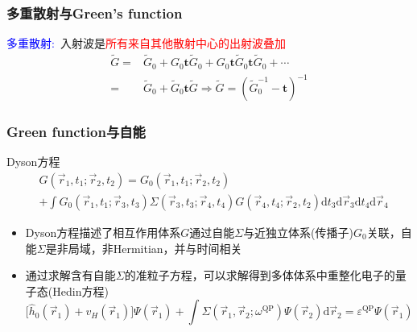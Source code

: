\documentclass[cjk,slidestop,compress,mathserif,blue]{beamer}
\begin{document}
\frame
{
	\frametitle{多重散射与\textrm{Green's function}}
\begin{figure}[h!]
	\vspace{-5pt}
\centering
{}
\label{Multiple_scattering-0-9}
\end{figure}
\textcolor{blue}{多重散射:~}入射波是\textcolor{red}{所有来自其他散射中心的出射波叠加}
			\begin{displaymath}
				\begin{aligned}
					\tilde G=&\tilde G_0+G_0\mathbf{t}\tilde G_0+G_0\mathbf{t}\tilde G_0\mathbf{t}\tilde G_0+\cdots\\
					=&\tilde G_0+\tilde G_0\mathbf{t}\tilde G \Longrightarrow \tilde G=(\tilde G_0^{-1}-\mathbf{t})^{-1}
				\end{aligned}
			\end{displaymath}
}

\frame
{
	\frametitle{\textrm{Green function}与自能}
	\textrm{Dyson}方程
	\begin{displaymath}
		\begin{aligned}
	&G(\vec r_1,t_1;\vec r_2,t_2)=G_0(\vec r_1,t_1;\vec r_2,t_2)\\
	&+\int G_0(\vec r_1,t_1;\vec r_3,t_3)\Sigma(\vec r_3,t_3;\vec r_4,t_4)G(\vec r_4,t_4;\vec r_2,t_2)\mathrm{d}t_3\mathrm{d}\vec r_3\mathrm{d}t_4\mathrm{d}\vec r_4
		\end{aligned}
	\end{displaymath}
	\begin{itemize}
		\item \textrm{Dyson}方程描述了相互作用体系$G$通过自能$\Sigma$与近独立体系(传播子)$G_0$关联，自能$\Sigma$是非局域，非\textrm{Hermitian}，并与时间相关
		\item 通过求解含有自能$\Sigma$的准粒子方程，可以求解得到多体体系中重整化电子的量子态(\textrm{Hedin}方程)
			$$\bigg[\hat h_0(\vec r_1)+v_H(\vec r_1)\bigg]\Psi(\vec r_1)+\int\Sigma(\vec r_1,\vec r_2;\omega^{\mathrm{QP}})\Psi(\vec r_2)\mathrm{d}\vec r_2=\varepsilon^{\mathrm{QP}}\Psi(\vec r_1)$$
	\end{itemize}
}
\end{document}
